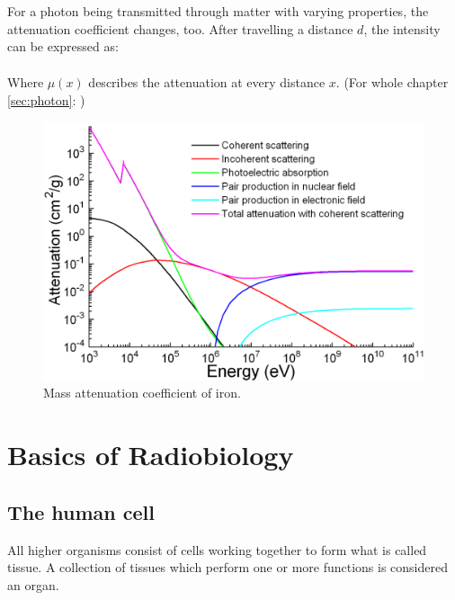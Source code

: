 For a photon being transmitted through matter with varying properties, the attenuation coefficient changes, too.
After travelling a distance $d$, the intensity can be expressed as:
\begin{align}
\label{eq:mu_int}
\end{align}

Where $\mu(x)$ describes the attenuation at every distance $x$.
(For whole chapter \ref{sec:photon}: \cite{Podgorsak, Maidment2014})

\begin{figure}[h!]
	\centering
	\includegraphics[width=0.7\linewidth]{../fig/intro/Ironattenuation}
	\caption[Mass attenuation coefficient of iron.]{Mass attenuation coefficient of iron. \footnotemark}
	\label{fig:attenuation_iron}
\end{figure}


\section{Basics of Radiobiology}
\label{sec:cell}
\subsection{The human cell}
All higher organisms consist of cells working together to form what is called tissue.
A collection of tissues which perform one or more functions is considered an organ. \\

